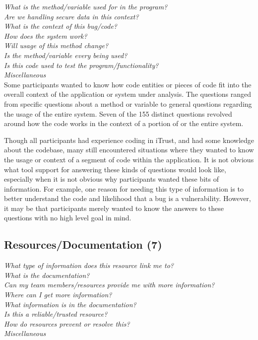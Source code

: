 \documentclass[conference]{IEEEtran}
\begin{document}
\noindent\emph{What is the method/variable used for in the program?} \\
\emph{Are we handling secure data in this context?} \\
\emph{What is the context of this bug/code?} \\
\emph{How does the system work?} \\
\emph{Will usage of this method change?} \\
\emph{Is the method/variable every being used?} \\
\emph{Is this code used to test the program/functionality?} \\
\emph{Miscellaneous} \\

Some participants wanted to know how code entities or pieces of code fit into the overall context of the application or system under analysis. 
The questions ranged from specific questions about a method or variable to general questions regarding the usage of the entire system. 
Seven of the 155 distinct questions revolved around how the code works in the context of a portion of or the entire system.


Though all participants had experience coding in iTrust, and had some knowledge about the codebase, many still encountered situations where they wanted to know the usage or context of a segment of code within the application. 
It is not obvious what tool support for answering these kinds of questions would look like, especially when it is not obvious why participants wanted these bits of information. 
For example, one reason for needing this type of information is to better understand the code and likelihood that a bug is a vulnerability. However, it may be that participants merely wanted to know the answers to these questions with no high level goal in mind.


\noindent\subsection{\textbf{Resources/Documentation (7)}}

\noindent\emph{What type of information does this resource link me to?} \\
\emph{What is the documentation?} \\
\emph{Can my team members/resources provide me with more information?} \\
\emph{Where can I get more information?} \\
\emph{What information is in the documentation?} \\
\emph{Is this a reliable/trusted resource?} \\
\emph{How do resources prevent or resolve this?} \\
\emph{Miscellaneous} \\
\end{document}
